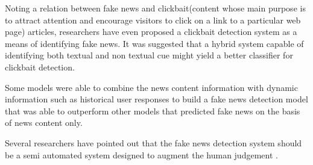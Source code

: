 Noting a relation between fake news and clickbait(content whose main purpose is to attract attention and encourage visitors to click on a link to a particular web page) articles, researchers have even proposed a clickbait detection system as a means of identifying fake news\cite{chen2015misleading}. It was suggested that a hybrid system capable of identifying both textual and non textual cue might yield a better classifier for clickbait detection\cite{chen2015misleading}.

Some models were able to combine the news content information with dynamic information such as historical user responses to build a fake news detection model that was able to outperform other models that predicted fake news on the basis of news content only\cite{qian2018neural}.

Several researchers have pointed out that the fake news detection system should be a semi automated system designed to augment the human judgement \cite{conroy2015automatic}
\cite{chen2015news}.